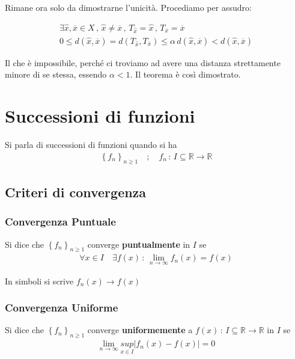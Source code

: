 Rimane ora solo da dimostrarne l'unicità. Procediamo per assudro:

\begin{align}
\exists \hat{x},\overline{x} \in X \, , \, \hat{x}\neq \overline{x}  \, , \, T_{\hat{x}}=\hat{x} \, , \, T_{\overline{x}}=\overline{x} \\
0\leq d(\hat{x},\overline{x})= d(T_{\hat{x}},T_{\overline{x}}) \leq \alpha \, d(\hat{x},\overline{x}) < d(\hat{x},\overline{x})
\end{align}

Il che è impossibile, perché ci troviamo ad avere una distanza strettamente minore di se stessa, essendo $\alpha <1$. Il teorema è così dimostrato.

\newpage

\section{Successioni di funzioni}

Si parla di successioni di funzioni quando si ha
\begin{align}
\left\{f_n \right\}_{n\geq 1} \quad ; \quad f_n \, : \, I \subseteq \mathbb{R} \longrightarrow \mathbb{R}
\end{align}

\subsection{Criteri di convergenza}

\subsubsection{Convergenza Puntuale}

Si dice che $\left\{f_n \right\}_{n\geq 1}$ converge \textbf{puntualmente} in $I$ se
\begin{align}
\forall x\in I \quad  \exists f(x) \, : \, \underset{n\rightarrow \infty}{\lim} f_n(x)= f(x)
\end{align}

In simboli si scrive $f_n(x) \longrightarrow f(x)$

\subsubsection{Convergenza Uniforme}

Si dice che $\left\{f_n \right\}_{n\geq 1}$ converge \textbf{uniformemente} a $f(x) \, : \, I \subseteq \mathbb{R} \longrightarrow \mathbb{R}$ in $I$ se
\begin{align}
\underset{n\rightarrow \infty}{\lim} \underset{x\in I}{sup}| f_n(x) - f(x)|=0
\end{align}

